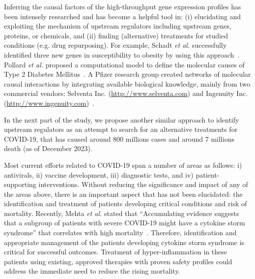 Inferring the causal factors of the high-throughput gene expression profiles has been intensely researched and has become a helpful tool in: (i) elucidating and exploiting the mechanism of upstream regulators including upstream genes, proteins, or chemicals, and (ii) finding (alternative) treatments for studied conditions (e.g. drug repurposing). 
For example, Schadt \emph{et al.} successfully identified three new genes in susceptibility to obesity by using this approach~\cite{schadt:2005}.
Pollard \emph{et al.} proposed a computational model to define the molecular causes of Type 2 Diabetes Mellitus~\cite{pollard2005computational}.  A Pfizer research group created networks of molecular causal interactions by integrating available biological knowledge, mainly from two commercial vendors: Selventa Inc. (\href{http://www.selventa.com}{http://www.selventa.com}) and Ingenuity Inc. (\href{http://www.ingenuity.com}{http://www.ingenuity.com})~\cite{chindelevitch2012causal}.

In the next part of the study, we propose another similar approach to identify upstream regulators as an attempt to search for an alternative treatments for COVID-19, that has caused around 800 millions cases and around 7 millions death (as of December 2023). 

Most current efforts related to COVID-19 span a number of areas as follows: i) antivirals, ii) vaccine development, iii) diagnostic tests, and iv) patient-supporting interventions. 
Without reducing the significance and impact of any of the areas above, there is an important aspect that has not been elucidated: the identification and treatment of patients developing critical conditions and risk of mortality.  Recently, Mehta \textit{et al.} stated that ``Accumulating evidence suggests that a subgroup of patients with severe COVID-19 might have a cytokine storm syndrome'' that correlates with high mortality~\cite{mehta2020covid}.
Therefore, identification and appropriate management of the patients developing cytokine storm syndrome is critical for successful outcomes. Treatment of hyper-inflammation in these patients using existing, approved therapies with proven safety profiles could address the immediate need to reduce the rising mortality. 

